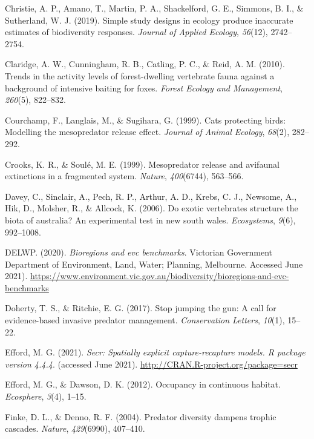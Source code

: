\documentclass[]{elsarticle} %
\begin{document}
\leavevmode\hypertarget{ref-christie2019}{}%
Christie, A. P., Amano, T., Martin, P. A., Shackelford, G. E., Simmons, B. I., \& Sutherland, W. J. (2019). Simple study designs in ecology produce inaccurate estimates of biodiversity responses. \emph{Journal of Applied Ecology}, \emph{56}(12), 2742--2754.

\leavevmode\hypertarget{ref-claridge2010}{}%
Claridge, A. W., Cunningham, R. B., Catling, P. C., \& Reid, A. M. (2010). Trends in the activity levels of forest-dwelling vertebrate fauna against a background of intensive baiting for foxes. \emph{Forest Ecology and Management}, \emph{260}(5), 822--832.

\leavevmode\hypertarget{ref-courchamp1999}{}%
Courchamp, F., Langlais, M., \& Sugihara, G. (1999). Cats protecting birds: Modelling the mesopredator release effect. \emph{Journal of Animal Ecology}, \emph{68}(2), 282--292.

\leavevmode\hypertarget{ref-crooks1999}{}%
Crooks, K. R., \& Soulé, M. E. (1999). Mesopredator release and avifaunal extinctions in a fragmented system. \emph{Nature}, \emph{400}(6744), 563--566.

\leavevmode\hypertarget{ref-davey2006}{}%
Davey, C., Sinclair, A., Pech, R. P., Arthur, A. D., Krebs, C. J., Newsome, A., Hik, D., Molsher, R., \& Allcock, K. (2006). Do exotic vertebrates structure the biota of australia? An experimental test in new south wales. \emph{Ecosystems}, \emph{9}(6), 992--1008.

\leavevmode\hypertarget{ref-delwp2020}{}%
DELWP. (2020). \emph{Bioregions and evc benchmarks}. Victorian Government Department of Environment, Land, Water; Planning, Melbourne. Accessed June 2021). \url{https://www.environment.vic.gov.au/biodiversity/bioregions-and-evc-benchmarks}

\leavevmode\hypertarget{ref-doherty2017}{}%
Doherty, T. S., \& Ritchie, E. G. (2017). Stop jumping the gun: A call for evidence-based invasive predator management. \emph{Conservation Letters}, \emph{10}(1), 15--22.

\leavevmode\hypertarget{ref-efford2021secr}{}%
Efford, M. G. (2021). \emph{Secr: Spatially explicit capture-recapture models. R package version 4.4.4}. (accessed June 2021). \url{http://CRAN.R-project.org/package=secr}

\leavevmode\hypertarget{ref-efford2012}{}%
Efford, M. G., \& Dawson, D. K. (2012). Occupancy in continuous habitat. \emph{Ecosphere}, \emph{3}(4), 1--15.

\leavevmode\hypertarget{ref-finke2004}{}%
Finke, D. L., \& Denno, R. F. (2004). Predator diversity dampens trophic cascades. \emph{Nature}, \emph{429}(6990), 407--410.
\end{document}
